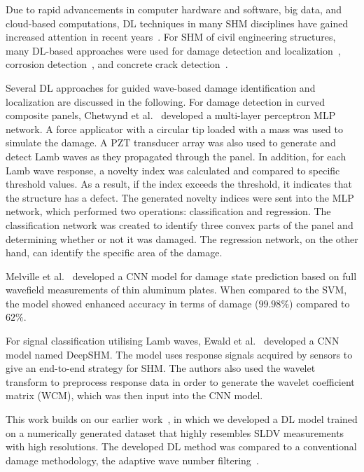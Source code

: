 \documentclass[runningheads]{llncs}
\begin{document}
Due to rapid advancements in computer hardware and software, big data, and cloud-based computations, DL techniques in many SHM disciplines have gained increased attention in recent years~\cite{Azimi}.
For SHM of civil engineering structures, many DL-based approaches were used for damage detection and localization~\cite{Cha2018, Kong2018}, corrosion detection~\cite{Atha2018}, and concrete crack detection~\cite{Dung2019}.


Several DL approaches for guided wave-based damage identification and localization are discussed in the following.
For damage detection in curved composite panels, Chetwynd et al.~\cite{Chetwynd2008} developed a multi-layer perceptron MLP network.
A force applicator with a circular tip loaded with a mass was used to simulate the damage.
A PZT transducer array was also used to generate and detect Lamb waves as they propagated through the panel.
In addition, for each Lamb wave response, a novelty index was calculated and compared to specific threshold values.
As a result, if the index exceeds the threshold, it indicates that the structure has a defect.
The generated novelty indices were sent into the MLP network, which performed two operations: classification and regression.
The classification network was created to identify three convex parts of the panel and determining whether or not it was damaged.
The regression network, on the other hand, can identify the specific area of the damage.

Melville et al.~\cite{Melville2018} developed a CNN model for damage state prediction based on full wavefield measurements of thin aluminum plates.
When compared to the SVM, the model showed enhanced accuracy in terms of damage (\(99.98\%\)) compared to \(62\%\).

For signal classification utilising Lamb waves, Ewald et al.~\cite{Ewald2019} developed a CNN model named DeepSHM.
The model uses response signals acquired by sensors to give an end-to-end strategy for SHM.
The authors also used the wavelet transform to preprocess response data in order to generate the wavelet coefficient matrix (WCM), which was then input into the CNN model.

This work builds on our earlier work~\cite{Ijjeh2021}, in which we developed a DL model trained on a numerically generated dataset that highly resembles SLDV measurements with high resolutions.
The developed DL method was compared to a conventional damage methodology, the adaptive wave number filtering~\cite{Kudela2015, Radzienski2019a}.
\end{document}
